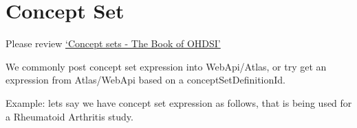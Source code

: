 \documentclass[
]{article}
\newenvironment{Shaded}{\begin{snugshade}}{\end{snugshade}}
\begin{document}
\hypertarget{concept-set}{%
\section{Concept Set}\label{concept-set}}

Please review
\href{https://ohdsi.github.io/TheBookOfOhdsi/Cohorts.html\#conceptSets}{`Concept
sets - The Book of OHDSI'}

We commonly post concept set expression into WebApi/Atlas, or try get an
expression from Atlas/WebApi based on a conceptSetDefinitionId.

Example: lets say we have concept set expression as follows, that is
being used for a Rheumatoid Arthritis study.

\begin{Shaded}
\begin{Highlighting}[]


\end{Highlighting}
\end{Shaded}
\end{document}
